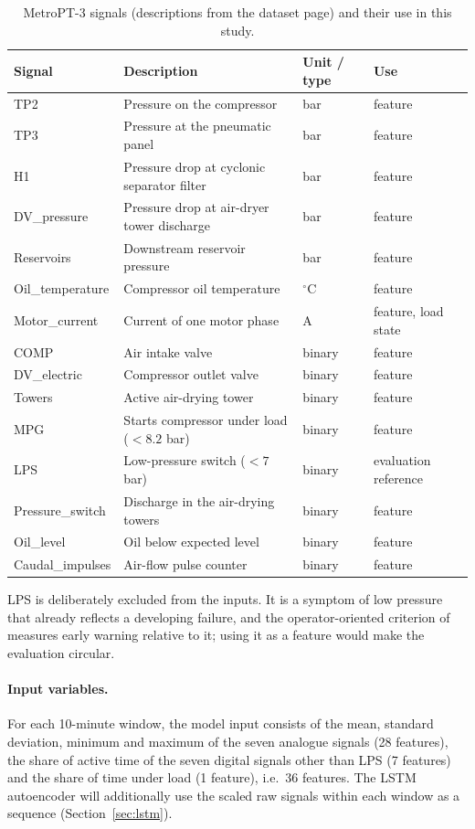 \begin{table}[H]
\centering
\small
\caption{MetroPT-3 signals (descriptions from the dataset page) and their use in this study.}
\label{tab:signals}
\begin{tabular}{llll}
\toprule
Signal & Description & Unit / type & Use \\
\midrule
TP2 & Pressure on the compressor & bar & feature \\
TP3 & Pressure at the pneumatic panel & bar & feature \\
H1 & Pressure drop at cyclonic separator filter & bar & feature \\
DV\_pressure & Pressure drop at air-dryer tower discharge & bar & feature \\
Reservoirs & Downstream reservoir pressure & bar & feature \\
Oil\_temperature & Compressor oil temperature & $^\circ$C & feature \\
Motor\_current & Current of one motor phase & A & feature, load state \\
COMP & Air intake valve & binary & feature \\
DV\_electric & Compressor outlet valve & binary & feature \\
Towers & Active air-drying tower & binary & feature \\
MPG & Starts compressor under load ($<8.2$ bar) & binary & feature \\
LPS & Low-pressure switch ($<7$ bar) & binary & evaluation reference \\
Pressure\_switch & Discharge in the air-drying towers & binary & feature \\
Oil\_level & Oil below expected level & binary & feature \\
Caudal\_impulses & Air-flow pulse counter & binary & feature \\
\bottomrule
\end{tabular}
\end{table}

LPS is deliberately excluded from the inputs. It is a symptom of low pressure that already reflects a developing failure, and the operator-oriented criterion of \citet{silva2023adversarial} measures early warning relative to it; using it as a feature would make the evaluation circular.

\paragraph{Input variables.} For each 10-minute window, the model input consists of the mean, standard deviation, minimum and maximum of the seven analogue signals (28 features), the share of active time of the seven digital signals other than LPS (7 features) and the share of time under load (1 feature), i.e.\ 36 features. The LSTM autoencoder will additionally use the scaled raw signals within each window as a sequence (Section~\ref{sec:lstm}).

